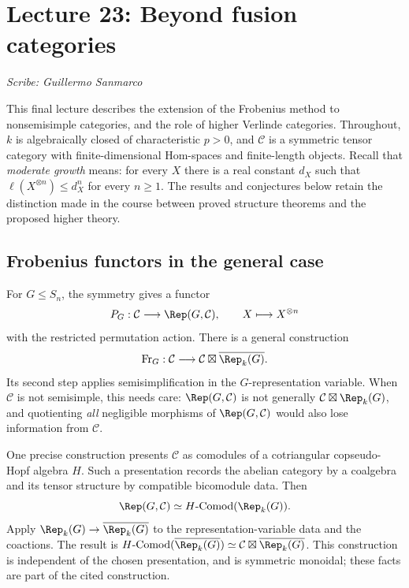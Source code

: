 \section{Lecture 23: Beyond fusion categories}
\label{lec23}
\noindent\textit{Scribe: Guillermo Sanmarco}

This final lecture describes the extension of the Frobenius method to
nonsemisimple categories, and the role of higher Verlinde categories.
Throughout, $k$ is algebraically closed of characteristic $p>0$, and
$\mathcal C$ is a symmetric tensor category with finite-dimensional
Hom-spaces and finite-length objects. Recall that \emph{moderate growth}
means: for every $X$ there is a real constant $d_X$ such that
$\ell(X^{\otimes n})\leq d_X^n$ for every $n\geq1$.
The results and conjectures below retain the distinction made in the
course between proved structure theorems and the proposed higher theory.

\subsection{Frobenius functors in the general case}
For $G\leq S_n$, the symmetry gives a functor
\[
 P_G:\mathcal C\longrightarrow\Rep(G,\mathcal C),\qquad
 X\longmapsto X^{\otimes n}
\]
with the restricted permutation action. There is a general construction
\cite[Section 3.1]{CEOFrobenius}
\begin{equation}\label{lec23-general-frobenius}
 \mathrm{Fr}_G:\mathcal C\longrightarrow
 \mathcal C\boxtimes\overline{\Rep_k(G)}.
\end{equation}
Its second step applies semisimplification in the $G$-representation
variable. When $\mathcal C$ is not semisimple, this needs care:
$\Rep(G,\mathcal C)$ is not generally
$\mathcal C\boxtimes\Rep_k(G)$, and quotienting \emph{all} negligible
morphisms of $\Rep(G,\mathcal C)$ would also lose information from
$\mathcal C$.

One precise construction presents $\mathcal C$ as comodules of a
cotriangular copseudo-Hopf algebra $H$. Such a presentation records the
abelian category by a coalgebra and its tensor structure by compatible
bicomodule data. Then
\[
 \Rep(G,\mathcal C)\simeq
 H\text{-}\mathrm{Comod}(\Rep_k(G)).
\]
Apply $\Rep_k(G)\to\overline{\Rep_k(G)}$ to the representation-variable
data and the coactions. The result is
$H\text{-}\mathrm{Comod}(\overline{\Rep_k(G)})
\simeq\mathcal C\boxtimes\overline{\Rep_k(G)}$.
This construction is independent of the chosen presentation, and is
symmetric monoidal; these facts are part of the cited construction.

